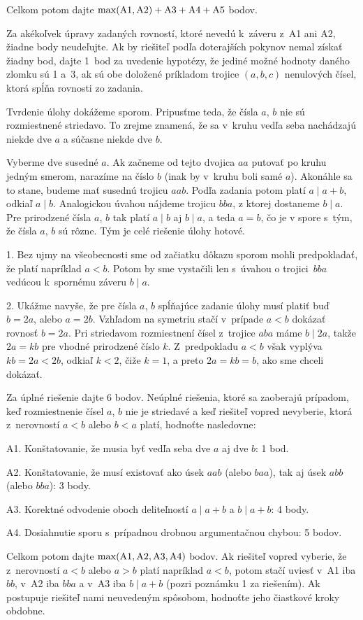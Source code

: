 {\smallskip\noindent
Celkom potom dajte $\rm\max(A1,A2)+A3+A4+A5$ bodov.

Za akékoľvek úpravy zadaných rovností, ktoré nevedú k~záveru
z~A1 ani A2, žiadne body neudeľujte. Ak by riešiteľ
podľa doterajších pokynov nemal získať žiadny bod, dajte
1~bod za uvedenie hypotézy, že jediné možné hodnoty daného zlomku
sú 1 a~3, ak sú obe doložené príkladom trojice $(a,b,c)$ nenulových čísel,
ktorá spĺňa rovnosti zo zadania.
\endschema
}

{%
Tvrdenie úlohy dokážeme sporom. Pripusťme teda, že čísla $a$, $b$
nie sú rozmiestnené striedavo. To zrejme znamená, že
sa v~kruhu vedľa seba nachádzajú niekde dve $a$ a súčasne niekde
dve $b$.

Vyberme dve susedné $a$. Ak začneme od tejto
dvojica $aa$ putovať po kruhu jedným smerom, narazíme na číslo
$b$ (inak by v~kruhu boli samé $a$). Akonáhle sa to stane, budeme
mať susednú trojicu $aab$. Podľa zadania potom platí $a\mid a+b$,
odkiaľ $a\mid b$. Analogickou úvahou nájdeme trojicu $bba$,
z ktorej dostaneme $b\mid a$. Pre prirodzené čísla $a$, $b$ tak platí
$a\mid b$ aj $b\mid a$, a teda $a=b$, čo je v spore s~tým, že čísla $a$, $b$ sú rôzne.
Tým je celé riešenie úlohy hotové.


\poznamky
\item{1.}
Bez ujmy na všeobecnosti sme od začiatku dôkazu sporom mohli
predpokladať, že platí napríklad $a<b$. Potom by sme vystačili
len s~úvahou o trojici~$bba$ vedúcou k~spornému záveru $b\mid a$.
\item{2.}
Ukážme navyše, že pre čísla $a$, $b$ spĺňajúce
zadanie úlohy musí platiť
buď $b=2a$, alebo $a=2b$. Vzhľadom na symetriu stačí
v~prípade $a<b$ dokázať rovnosť $b=2a$. Pri striedavom rozmiestnení čísel
z~trojice $aba$ máme $b\mid 2a$, takže $2a=kb$ pre
vhodné prirodzené číslo $k$. Z~predpokladu $a<b$ však vyplýva
$kb=2a<2b$, odkiaľ $k<2$, čiže $k=1$, a preto $2a=kb=b$, ako sme
chceli dokázať.

\schemaABC
Za úplné riešenie dajte 6 bodov. Neúplné riešenia, ktoré sa zaoberajú
prípadom, keď rozmiestnenie čísel $a$, $b$ nie je striedavé a keď
riešiteľ vopred nevyberie, ktorá z~nerovností $a<b$ alebo $b<a$
platí, hodnoťte nasledovne:

\smallskip
\item{A1.} Konštatovanie, že musia byť vedľa seba dve $a$ aj dve $b$: 1 bod.
\item{A2.} Konštatovanie, že musí existovať ako úsek $aab$ (alebo $baa$), tak aj úsek $abb$ (alebo $bba$): 3 body.
\item{A3.} Korektné odvodenie oboch deliteľností $a\mid a+b$ a $b\mid a+b$: 4 body.
\item{A4.} Dosiahnutie sporu s~prípadnou drobnou argumentačnou chybou: 5 bodov.

\smallskip\noindent
Celkom potom dajte $\rm\max(A1,A2,A3,A4)$ bodov. Ak riešiteľ vopred vyberie, že z~nerovností $a<b$ alebo $a>b$ platí
napríklad $a<b$, potom stačí uviesť v~A1 iba $bb$, v~A2 iba $bba$
a v~A3 iba $b\mid a+b$ (pozri poznámku 1 za riešením).
Ak postupuje riešiteľ nami neuvedeným spôsobom, hodnoťte jeho
čiastkové kroky obdobne.
\endschema
}

